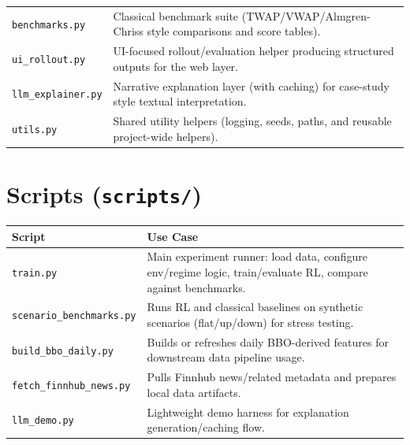 \documentclass[11pt]{article}
\begin{document}
\begin{longtable}{>{\raggedright\arraybackslash}p{} >{\raggedright\arraybackslash}p{}}
\texttt{benchmarks.py} & Classical benchmark suite (TWAP/VWAP/Almgren-Chriss style comparisons and score tables). \\
\texttt{ui\_rollout.py} & UI-focused rollout/evaluation helper producing structured outputs for the web layer. \\
\texttt{llm\_explainer.py} & Narrative explanation layer (with caching) for case-study style textual interpretation. \\
\texttt{utils.py} & Shared utility helpers (logging, seeds, paths, and reusable project-wide helpers). \\
\end{longtable}

\section{Scripts (\texttt{scripts/})}
\begin{longtable}{>{\raggedright\arraybackslash}p{} >{\raggedright\arraybackslash}p{}}
\textbf{Script} & \textbf{Use Case} \\
\hline
\texttt{train.py} & Main experiment runner: load data, configure env/regime logic, train/evaluate RL, compare against benchmarks. \\
\texttt{scenario\_benchmarks.py} & Runs RL and classical baselines on synthetic scenarios (flat/up/down) for stress testing. \\
\texttt{build\_bbo\_daily.py} & Builds or refreshes daily BBO-derived features for downstream data pipeline usage. \\
\texttt{fetch\_finnhub\_news.py} & Pulls Finnhub news/related metadata and prepares local data artifacts. \\
\texttt{llm\_demo.py} & Lightweight demo harness for explanation generation/caching flow. \\
\end{longtable}
\end{document}
